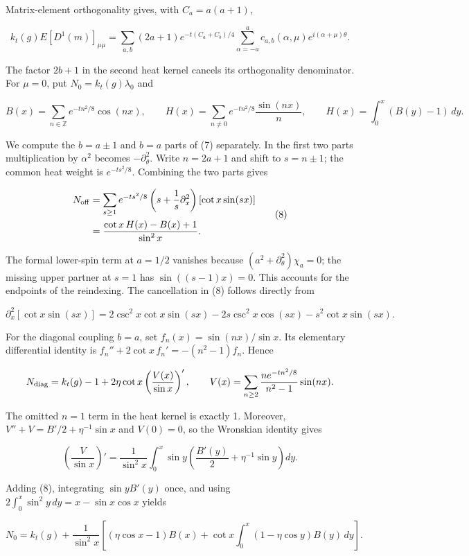 \documentclass[11pt,a4paper]{article}
\begin{document}
Matrix-element orthogonality gives, with \(C_a=a(a+1)\),

\[k_t(g)E[D^1(m)]_{\mu\mu}
=\sum_{a,b}(2a+1)e^{-t(C_a+C_b)/4}
\sum_{\alpha=-a}^{a}c_{a,b}(\alpha,\mu)e^{i(\alpha+\mu)\theta}.
\tag{7}\]

The factor \(2b+1\) in the second heat kernel cancels its orthogonality
denominator. For \(\mu=0\), put \(N_0=k_t(g)\lambda_0\) and

\[B(x)=\sum_{n\in\mathbb Z}e^{-tn^2/8}\cos(nx),\qquad
H(x)=\sum_{n\ne0}e^{-tn^2/8}\frac{\sin(nx)}n,
\qquad H(x)=\int_0^x(B(y)-1)\,dy.\]

We compute the \(b=a\pm1\) and \(b=a\) parts of (7) separately. In the
first two parts multiplication by \(\alpha^2\) becomes
\(-\partial_\theta^2\). Write \(n=2a+1\) and shift to \(s=n\pm1\); the
common heat weight is \(e^{-ts^2/8}\). Combining the two parts gives

\[\begin{aligned}
N_{\rm off}
&=\sum_{s\ge1}e^{-ts^2/8}
\left(s+\frac1s\partial_x^2\right)[\cot x\sin(sx)]\\
&=\frac{\cot x\,H(x)-B(x)+1}{\sin^2x}.
\end{aligned}\tag{8}\]

The formal lower-spin term at \(a=1/2\) vanishes because
\((a^2+\partial_\theta^2)\chi_a=0\); the missing upper partner at
\(s=1\) has \(\sin((s-1)x)=0\). This accounts for the endpoints of the
reindexing. The cancellation in (8) follows directly from

\[\partial_x^2[\cot x\sin(sx)]
=2\csc^2x\cot x\sin(sx)-2s\csc^2x\cos(sx)
-s^2\cot x\sin(sx).\]

For the diagonal coupling \(b=a\), set \(f_n(x)=\sin(nx)/\sin x\). Its
elementary differential identity is \(f_n''+2\cot x\,f_n'=-(n^2-1)f_n\).
Hence

\[N_{\rm diag}=k_t(g)-1
+2\eta\cot x\left(\frac{V(x)}{\sin x}\right)',\qquad
V(x)=\sum_{n\ge2}\frac{n e^{-tn^2/8}}{n^2-1}\sin(nx).\]

The omitted \(n=1\) term in the heat kernel is exactly 1. Moreover,
\(V''+V=B'/2+\eta^{-1}\sin x\) and \(V(0)=0\), so the Wronskian identity
gives

\[\left(\frac{V}{\sin x}\right)'
=\frac1{\sin^2x}\int_0^x\sin y
\left(\frac{B'(y)}2+\eta^{-1}\sin y\right)dy.\]

Adding (8), integrating \(\sin y B'(y)\) once, and using
\(2\int_0^x\sin^2y\,dy=x-\sin x\cos x\) yields

\[N_0=k_t(g)+\frac1{\sin^2x}\left[
(\eta\cos x-1)B(x)+\cot x\int_0^x(1-\eta\cos y)B(y)\,dy\right].
\tag{9}\]
\end{document}
